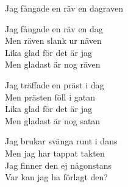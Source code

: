\begin{song}{Jag fångade en räv en dag}{raven}
\begin{vers}
Jag fångade en räv en dag\\
Men räven slank ur näven\\
Lika glad för det är jag\\
Men gladast är nog räven\\
\end{vers}
\begin{vers}
Jag träffade en präst i dag\\
Men prästen föll i gatan\\
Lika glad för det är jag\\
Men gladast är nog satan\\
\end{vers}

\begin{vers}
Jag brukar svänga runt i dans\\
Men jag har tappat takten\\
Jag finner den ej någonstans\\
Var kan jag ha förlagt den?\\
\end{vers}

\end{song}
